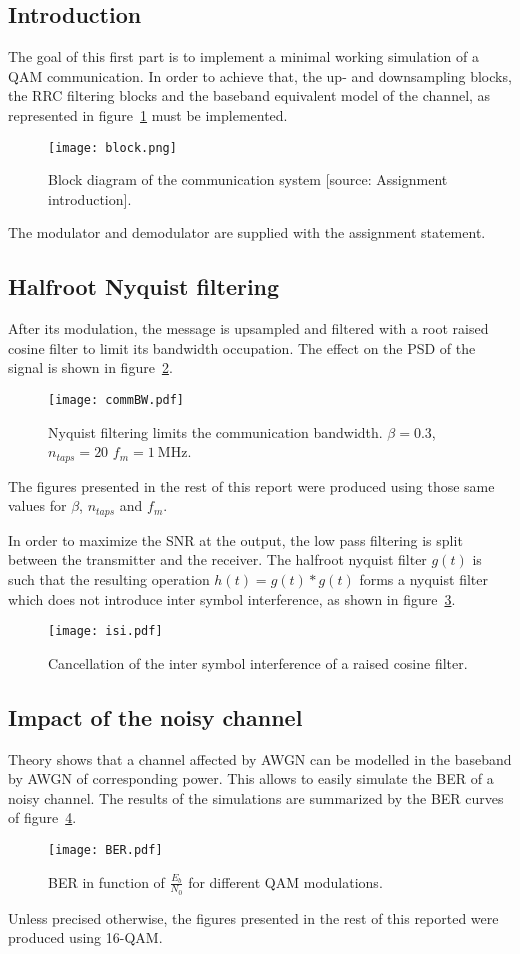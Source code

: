 \subsection{Introduction}
The goal of this first part is to implement a minimal working simulation of a QAM communication.
In order to achieve that, the up- and downsampling blocks, the RRC filtering blocks and the baseband equivalent model of the channel, as represented in figure~\ref{fig:chain} must be implemented.
\begin{figure}[htbp]
\centering
\texttt{[image: block.png]}
\caption{Block diagram of the communication system [source: Assignment introduction].\label{fig:chain}}
\end{figure}
The modulator and demodulator are supplied with the assignment statement.

\subsection{Halfroot Nyquist filtering}
After its modulation, the message is upsampled and filtered with a root raised cosine filter to limit its bandwidth occupation.
The effect on the PSD of the signal is shown in figure~\ref{fig:LPF}.
\begin{figure}[htbp]
\centering
\texttt{[image: commBW.pdf]}
\caption{Nyquist filtering limits the communication bandwidth. $\beta = 0.3$, $n_{taps} = 20$ $f_m = \SI{1}{\mega\hertz}.$ \label{fig:LPF}}
\end{figure}
The figures presented in the rest of this report were produced using those same values for $\beta$, $n_{taps}$ and $f_m$.

In order to maximize the SNR at the output, the low pass filtering is split between the transmitter and the receiver.
The halfroot nyquist filter $g(t)$ is such that the resulting operation $h(t) = g(t)*g(t)$ forms a nyquist filter which does not introduce inter symbol interference, as shown in figure~\ref{fig:noISI}.
\begin{figure}
\centering
\texttt{[image: isi.pdf]}
\caption{Cancellation of the inter symbol interference of a raised cosine filter.\label{fig:noISI}}
\end{figure}

\subsection{Impact of the noisy channel}
Theory shows that a channel affected by AWGN can be modelled in the baseband by AWGN of corresponding power.
This allows to easily simulate the BER of a noisy channel.
The results of the simulations are summarized by the BER curves of figure~\ref{fig:BER}.
\begin{figure}[htbp]
\texttt{[image: BER.pdf]}
\caption{BER in function of $\frac{E_b}{N_0}$ for different QAM modulations.\label{fig:BER}}
\end{figure}
Unless precised otherwise, the figures presented in the rest of this reported were produced using 16-QAM.

